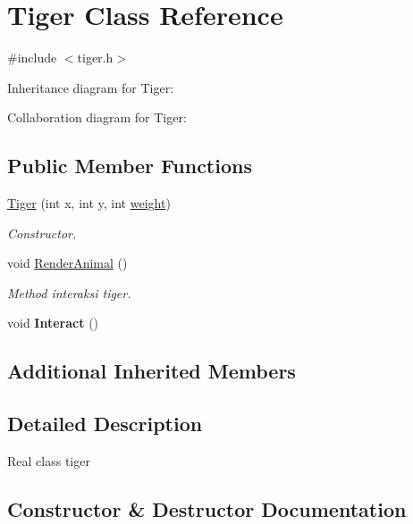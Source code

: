 \hypertarget{classTiger}{}\section{Tiger Class Reference}
\label{classTiger}


{\ttfamily \#include $<$tiger.\+h$>$}



Inheritance diagram for Tiger\+:


Collaboration diagram for Tiger\+:
\subsection*{Public Member Functions}
\begin{DoxyCompactItemize}
\item 
\hyperlink{classTiger_aa4604524d55c97444310b333228ad456}{Tiger} (int x, int y, int \hyperlink{classAnimal_a9a3b22f243f7109c57f36b3c660feb6e}{weight})
\begin{DoxyCompactList}\small\item\em Constructor. \end{DoxyCompactList}\item 
void \hyperlink{classTiger_ac9661764d305a083a94522023e9aa311}{Render\+Animal} ()\hypertarget{classTiger_ac9661764d305a083a94522023e9aa311}{}\label{classTiger_ac9661764d305a083a94522023e9aa311}

\begin{DoxyCompactList}\small\item\em Method interaksi tiger. \end{DoxyCompactList}\item 
void {\bfseries Interact} ()\hypertarget{classTiger_a7ab54d45a36306f9c4fd3af6fb5f5118}{}\label{classTiger_a7ab54d45a36306f9c4fd3af6fb5f5118}

\end{DoxyCompactItemize}
\subsection*{Additional Inherited Members}


\subsection{Detailed Description}
Real class tiger 

\subsection{Constructor \& Destructor Documentation}
